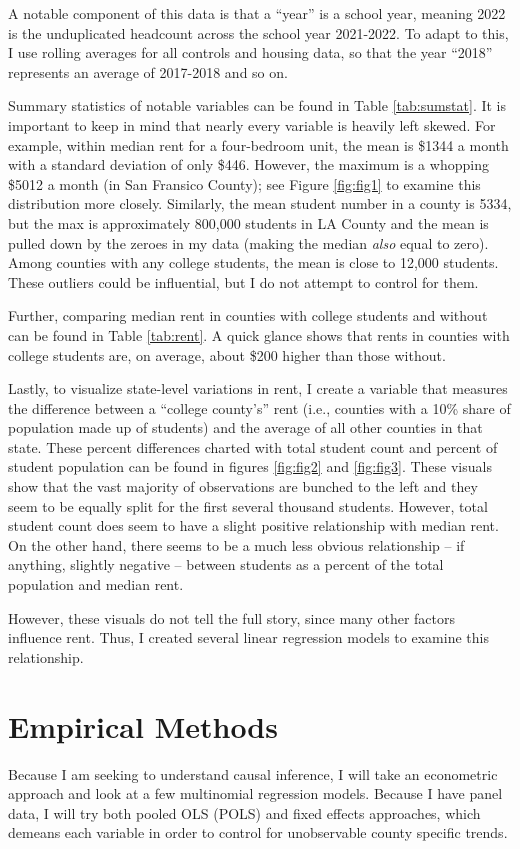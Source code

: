 \documentclass[12pt,english]{article}
\begin{document}
A notable component of this data is that a “year” is a school year, meaning 2022 is the unduplicated headcount across the school year 2021-2022. To adapt to this, I use rolling averages for all controls and housing data, so that the year “2018” represents an average of 2017-2018 and so on.

Summary statistics of notable variables can be found in Table \ref{tab:sumstat}. It is important to keep in mind that nearly every variable is heavily left skewed. For example, within median rent for a four-bedroom unit, the mean is \$1344 a month with a standard deviation of only \$446. However, the maximum is a whopping \$5012 a month (in San Fransico County); see Figure \ref{fig:fig1} to examine this distribution more closely. Similarly, the mean student number in a county is 5334, but the max is approximately 800,000 students in LA County and the mean is pulled down by the zeroes in my data (making the median \textit{also} equal to zero). Among counties with any college students, the mean is close to 12,000 students. These outliers could be influential, but I do not attempt to control for them.

Further, comparing median rent in counties with college students and without can be found in Table \ref{tab:rent}. A quick glance shows that rents in counties with college students are, on average, about \$200 higher than those without. 

Lastly, to visualize state-level variations in rent, I create a variable that measures the difference between a ``college county's'' rent (i.e., counties with a 10\% share of population made up of students) and the average of all other counties in that state. These percent differences charted with total student count and percent of student population can be found in figures \ref{fig:fig2} and \ref{fig:fig3}. These visuals show that the vast majority of observations are bunched to the left and they seem to be equally split for the first several thousand students. However, total student count does seem to have a slight positive relationship with median rent. On the other hand, there seems to be a much less obvious relationship -- if anything, slightly negative -- between students as a percent of the total population and median rent. 

However, these visuals do not tell the full story, since many other factors influence rent. Thus, I created several linear regression models to examine this relationship. 


\section{Empirical Methods}\label{sec:methods}
Because I am seeking to understand causal inference, I will take an econometric approach and look at a few multinomial regression models. Because I have panel data, I will try both pooled OLS (POLS) and fixed effects approaches, which demeans each variable in order to control for unobservable county specific trends. 
\end{document}
